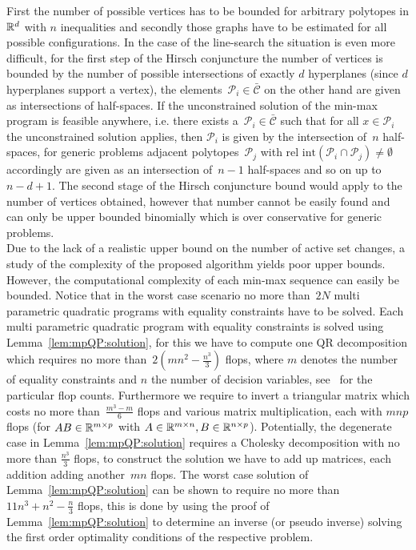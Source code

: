 %
First the number of possible vertices has to be bounded for arbitrary polytopes in $\mathbb R^d$ with $n$ inequalities and secondly those graphs have to be estimated for all possible configurations.
%
In the case of the line-search the situation is even more difficult, for the first step of the Hirsch conjuncture the number of vertices is bounded by the number of possible intersections of exactly $d$ hyperplanes (since $d$ hyperplanes support a vertex), the elements~$\mathcal P_i\in\bar{\mathcal C}$ on the other hand are given as intersections of half-spaces.
%
If the unconstrained solution of the min-max program is feasible anywhere, i.e. there exists a~$\mathcal P_i\in\bar{\mathcal C}$ such that for all $x\in\mathcal P_i$ the unconstrained solution applies, then $\mathcal P_i$ is given by the intersection of~$n$ half-spaces, for generic problems adjacent polytopes~$\mathcal P_j$ with $\text{rel int}(\mathcal P_i\cap\mathcal P_j)\neq\emptyset$ accordingly are given as an intersection of~$n-1$ half-spaces and so on up to~$n-d+1$.
%
The second stage of the Hirsch conjuncture bound would apply to the number of vertices obtained, however that number cannot be easily found and can only be upper bounded binomially which is over conservative for generic problems.
%
%
\\[1em]
%
\mysplit Due to the lack of a realistic upper bound on the number of active set changes, a study of the complexity of the proposed algorithm yields poor upper bounds.
%
However, the computational complexity of each min-max sequence can easily be bounded.
%
Notice that in the worst case scenario no more than~$2N$ multi parametric quadratic programs with equality constraints have to be solved.
%
Each multi parametric quadratic program with equality constraints is solved using Lemma~\ref{lem:mpQP:solution}, for this we have to compute one QR decomposition which requires no more than~$2(mn^2-\frac{n^3}{3})$ flops, where $m$ denotes the number of equality constraints and $n$ the number of decision variables, see~\cite{Golub:1996} for the particular flop counts.
%
Furthermore we require to invert a triangular matrix which costs no more than~$\frac{m^3-m}{6}$ flops and various matrix multiplication, each with $mnp$ flops (for $AB\in\mathbb R^{m\times p}$ with $A\in\mathbb R^{m\times n}, B\in\mathbb R^{n\times p}$).
%
Potentially, the degenerate case in Lemma~\ref{lem:mpQP:solution} requires a Cholesky decomposition with no more than $\frac{n^3}{3}$ flops, to construct the solution we have to add up matrices, each addition adding another~$mn$ flops.
%
The worst case solution of Lemma~\ref{lem:mpQP:solution} can be shown to require no more than~$11n^3+n^2-\frac{n}{3}$ flops, this is done by using the proof of Lemma~\ref{lem:mpQP:solution} to determine an inverse (or pseudo inverse) solving the first order optimality conditions of the respective problem.
